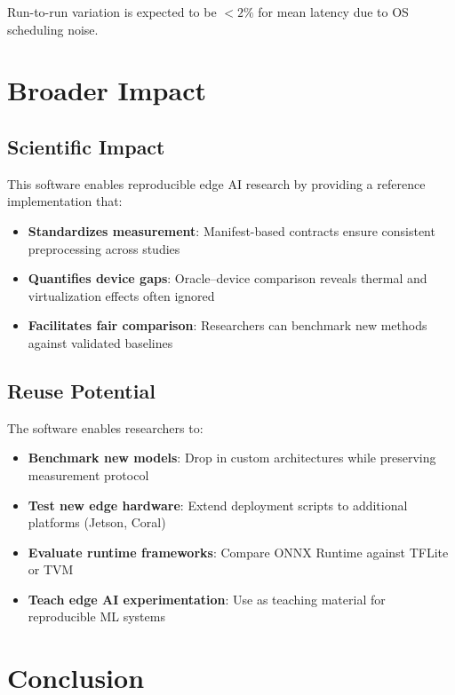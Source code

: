 \documentclass[review]{elsarticle}
\begin{document}
Run-to-run variation is expected to be $< 2\%$ for mean latency due to OS scheduling noise.

\section{Broader Impact}
\label{sec:broader-impact}

\subsection{Scientific Impact}

This software enables reproducible edge AI research by providing a reference implementation that:

\begin{itemize}
\item \textbf{Standardizes measurement}: Manifest-based contracts ensure consistent preprocessing across studies
\item \textbf{Quantifies device gaps}: Oracle--device comparison reveals thermal and virtualization effects often ignored
\item \textbf{Facilitates fair comparison}: Researchers can benchmark new methods against validated baselines
\end{itemize}

\subsection{Reuse Potential}

The software enables researchers to:

\begin{itemize}
\item \textbf{Benchmark new models}: Drop in custom architectures while preserving measurement protocol
\item \textbf{Test new edge hardware}: Extend deployment scripts to additional platforms (Jetson, Coral)
\item \textbf{Evaluate runtime frameworks}: Compare ONNX Runtime against TFLite or TVM
\item \textbf{Teach edge AI experimentation}: Use as teaching material for reproducible ML systems
\end{itemize}


\section{Conclusion}
\end{document}
